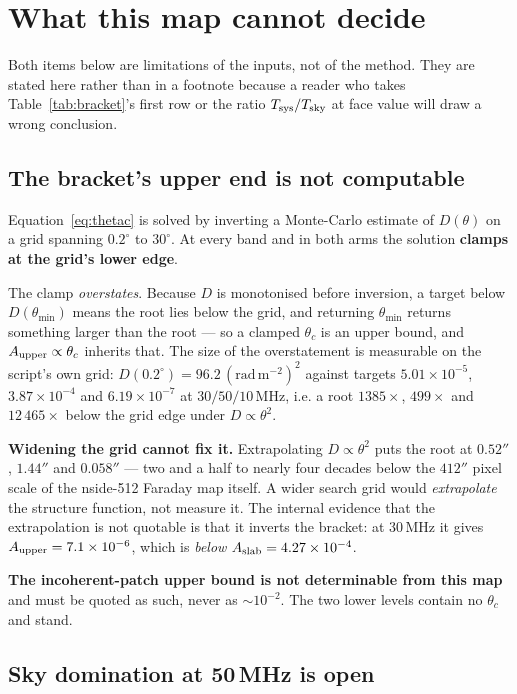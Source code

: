 \documentclass[11pt]{article}
\newcommand{\rmu}{\ensuremath{\mathrm{rad\,m^{-2}}}}
\begin{document}
\section{What this map cannot decide}
\label{sec:cannot}

Both items below are limitations of the inputs, not of the method. They
are stated here rather than in a footnote because a reader who takes
Table~\ref{tab:bracket}'s first row or the ratio $T_{\rm sys}/T_{\rm
sky}$ at face value will draw a wrong conclusion.

\subsection{The bracket's upper end is not computable}
\label{sec:clamp}

Equation~\eqref{eq:thetac} is solved by inverting a Monte-Carlo estimate
of $D(\theta)$ on a grid spanning $0.2^\circ$ to $30^\circ$. At every
band and in both arms the solution \textbf{clamps at the grid's lower
edge}.

The clamp \emph{overstates}. Because $D$ is monotonised before
inversion, a target below $D(\theta_{\min})$ means the root lies below
the grid, and returning $\theta_{\min}$ returns something larger than the
root --- so a clamped $\theta_c$ is an upper bound, and
$A_{\rm upper} \propto \theta_c$ inherits that. The size of the
overstatement is measurable on the script's own grid:
$D(0.2^\circ) = 96.2\,(\rmu)^2$ against targets $5.01\times10^{-5}$,
$3.87\times10^{-4}$ and $6.19\times10^{-7}$ at $30/50/10$\,MHz, i.e. a
root $1385\times$, $499\times$ and $12\,465\times$ below the grid edge
under $D \propto \theta^2$.

\textbf{Widening the grid cannot fix it.} Extrapolating $D\propto\theta^2$
puts the root at $0.52''$, $1.44''$ and $0.058''$ --- two and a half to
nearly four decades below the $412''$ pixel scale of the nside-512
Faraday map itself. A wider search grid would \emph{extrapolate} the
structure function, not measure it. The internal evidence that the
extrapolation is not quotable is that it inverts the bracket: at 30\,MHz
it gives $A_{\rm upper} = 7.1\times10^{-6}$, which is \emph{below}
$A_{\rm slab} = 4.27\times10^{-4}$.

\textbf{The incoherent-patch upper bound is not determinable from this
map} and must be quoted as such, never as $\sim\!10^{-2}$. The two lower
levels contain no $\theta_c$ and stand.

\subsection{Sky domination at 50\,MHz is open}
\end{document}
